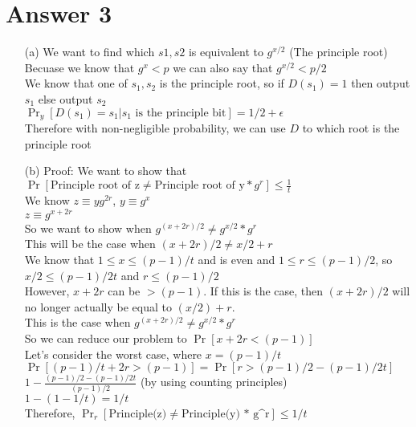 \documentclass[11pt]{article}
\theoremstyle{definition}
\begin{document}
\section*{Answer 3}
\begin{enumerate}
	\item[(a)]
	We want to find which $s1,s2$ is equivalent to $g^{x/2}$ (The principle root)\\
	Becuase we know that $g^x < p$ we can also say that $g^{x/2} < p/2$\\
	We know that one of $s_1,s_2$ is the principle root, so if $D(s_1) = 1$ then output $s_1$ else output $s_2$\\
	$\Pr_y[D(s_1) = s_1 | s_1 \text{ is the principle bit}] = 1/2 + \epsilon$\\
	Therefore with non-negligible probability, we can use $D$ to which root is the principle root\\

	\item[(b)]
	Proof: We want to show that $\Pr[\text{Principle root of z} \neq \text{Principle root of y} * g^r] \le \frac{1}{t}$\\
	We know $z \equiv yg^{2r}$, $y \equiv g^x$\\
	$z \equiv g^{x + 2r}$\\
	So we want to show when $g^{(x + 2r)/2} \neq g^{x/2} * g^r$\\
	This will be the case when $(x + 2r)/2 \neq x/2 + r$\\
	We know that $1 \le x \le (p-1)/t$ and is even and $1 \le r \le (p-1)/2$, so $x/2 \le (p-1)/2t$ and $r \le (p-1)/2$\\
	However, $x + 2r$ can be $> (p-1)$.  If this is the case, then $(x + 2r)/2$ will no longer actually be equal to $(x/2) + r$.\\
	This is the case when $g^{(x + 2r)/2} \neq g^{x/2} * g^r$\\
	So we can reduce our problem to $\Pr[x + 2r < (p-1)]$\\
	Let's consider the worst case, where $x = (p-1)/t$\\
	$\Pr[(p-1)/t + 2r > (p-1)] = \Pr[r > (p-1)/2 - (p-1)/2t]$\\
	$1 - \frac{(p-1)/2 - (p-1)/2t}{(p-1)/2}$ (by using counting principles)\\
	$1 - (1 - 1/t) = 1/t$\\
	Therefore, $\Pr_r[\text{Principle(z)} \neq \text{Principle(y) * g^r}] \le 1/t$


\end{enumerate}
\end{document}
